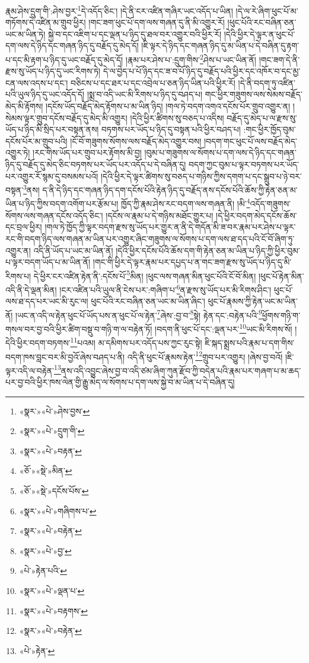རྣམ་ཤེས་དྲུག་གི་:ཤེས་བྱར་\footnote{«སྣར་»«པེ་»ཤེས་བྱས་}དེ་འདོད་ཅིང་། །དེ་ནི་ངར་འཛིན་གཞིར་ཡང་འདོད་པ་ཡིན། །དེ་ལ་རེ་ཞིག་ཕུང་པོ་མ་གཏོགས་དེ་འཛིན་མ་གྲུབ་ཕྱིར། །གང་ཟག་ཕུང་པོ་དག་ལས་གཞན་དུ་ནི་མི་འགྱུར་རོ། །ཕུང་པོའི་རང་བཞིན་ཅན་ཡང་མ་ཡིན་ཏེ། སྐྱེ་བ་དང་འཇིག་པ་དང་ལྡན་པ་ཉིད་དུ་ཐལ་བར་འགྱུར་བའི་ཕྱིར་རོ། །དེའི་ཕྱིར་དེ་ལྟར་ན་ཕུང་པོ་དག་ལས་དེ་ཉིད་དང་གཞན་ཉིད་དུ་བརྗོད་དུ་མེད་དོ། །ཇི་ལྟར་དེ་ཉིད་དང་གཞན་ཉིད་དུ་མ་ཡིན་པ་དེ་བཞིན་དུ་རྟག་པ་དང་མི་རྟག་པ་ཉིད་དུ་ཡང་བརྗོད་དུ་མེད་དོ། །རྣམ་པར་ཤེས་པ་:དྲུག་གིས་\footnote{«སྣར་»«པེ་»དྲུག་གི་}ཤེས་པ་ཡང་ཡིན་ནོ། །གང་ཟག་དེ་ནི་རྫས་སུ་ཡོད་པ་ཉིད་དུ་ཡང་རིགས་ཏེ། དེ་ལ་བྱེད་པ་པོ་ཉིད་དང་ཟ་བ་པོ་ཉིད་དུ་བརྗོད་པའི་ཕྱིར་དང་འཁོར་བ་དང་མྱ་ངན་ལས་འདས་པ་དང་། བཅིངས་པ་དང་ཐར་པ་དང་འབྲེལ་པ་ཅན་ཉིད་ཡིན་པའི་ཕྱིར་རོ། །དེ་ནི་བདག་ཏུ་འཛིན་པའི་ཡུལ་ཉིད་དུ་ཡང་འདོད་དོ། །སྨྲ་བ་འདི་ཡང་མི་རིགས་པ་ཉིད་དུ་བཤད་པ། གང་ཕྱིར་གཟུགས་ལས་སེམས་བརྗོད་མེད་མི་རྟོགས། །དངོས་ཡོད་བརྗོད་མེད་རྟོགས་པ་མ་ཡིན་ཉིད། །གལ་ཏེ་བདག་འགའ་དངོས་པོར་གྲུབ་འགྱུར་ན། །སེམས་ལྟར་གྲུབ་དངོས་བརྗོད་དུ་མེད་མི་འགྱུར། །དེའི་ཕྱིར་ཚིགས་སུ་བཅད་པ་འདིས། བརྗོད་དུ་མེད་པ་ལ་རྫས་སུ་ཡོད་པ་ཉིད་མི་སྲིད་པར་བསྟན་ནས། བཏགས་པར་ཡོད་པ་ཉིད་དུ་བསྟན་པའི་ཕྱིར་བཤད་པ། :གང་ཕྱིར་ཁྱོད་བུམ་དངོས་པོར་མ་གྲུབ་པའི། །ངོ་བོ་གཟུགས་སོགས་ལས་བརྗོད་མེད་འགྱུར་བས། །བདག་གང་ཕུང་པོ་ལས་བརྗོད་མེད་འགྱུར་ཏེ། །རང་གིས་ཡོད་པར་གྲུབ་པར་རྟོགས་མི་བྱ། །བུམ་པ་གཟུགས་ལ་སོགས་པ་དག་ལས་དེ་ཉིད་དང་གཞན་ཉིད་དུ་བརྗོད་དུ་མེད་ཅིང་བཏགས་པར་ཡོད་པར་འདོད་པ་དེ་བཞིན་དུ། བདག་ཀྱང་བུམ་པ་ལྟར་བཏགས་པར་ཡོད་པར་འགྱུར་རོ་སྙམ་དུ་བསམས་པའོ། །དེའི་ཕྱིར་དེ་ལྟར་ཚིགས་སུ་བཅད་པ་གཉིས་ཀྱིས་དགག་པ་དང་སྒྲུབ་པ་ཉེ་བར་བསྟན་\footnote{«སྣར་»«པེ་»བརྟན་}ནས། ད་ནི་དེ་ཉིད་དང་གཞན་ཉིད་དག་དངོས་པོའི་རྟེན་ཉིད་དུ་བརྗོད་ནས་དངོས་པོའི་ཆོས་ཀྱི་རྟེན་ཅན་མ་ཡིན་པ་ཉིད་ཀྱིས་བདག་འགོག་པར་རྩོམ་པ། ཁྱོད་ཀྱི་རྣམ་ཤེས་རང་བདག་ལས་གཞན་ནི། །མི་\footnote{«ཅོ་»«སྡེ་»མིན་}འདོད་གཟུགས་སོགས་ལས་གཞན་དངོས་འདོད་ཅིང་། །དངོས་ལ་རྣམ་པ་དེ་གཉིས་མཐོང་གྱུར་པ། །དེ་ཕྱིར་བདག་མེད་དངོས་ཆོས་དང་བྲལ་ཕྱིར། །གལ་ཏེ་ཁྱོད་ཀྱི་ལྟར་བདག་རྫས་སུ་ཡོད་པར་གྱུར་ན་ནི་དེ་གདོན་མི་ཟ་བར་རྣམ་པར་ཤེས་པ་ལྟར་རང་གི་བདག་ཉིད་ལས་གཞན་མ་ཡིན་པར་འགྱུར་ཞིང་གཟུགས་ལ་སོགས་པ་དག་ལས་ཐ་དད་པའི་ངོ་བོ་ཞིག་ཏུ་འགྱུར་ན། འདི་ནི་ཡོད་པ་ཡང་མ་ཡིན་ནོ། །དེའི་ཕྱིར་དངོས་པོའི་ཆོས་དག་གི་རྟེན་ཅན་མ་ཡིན་པ་ཉིད་ཀྱི་ཕྱིར་བུམ་པ་ལྟར་བདག་ཡོད་པ་མ་ཡིན་ནོ། །གང་གི་ཕྱིར་དེ་ལྟར་རྣམ་པར་དཔྱད་པ་ན་གང་ཟག་རྫས་སུ་ཡོད་པ་ཉིད་དུ་མི་རིགས་པ། དེ་ཕྱིར་ངར་འཛིན་རྟེན་ནི་:དངོས་པོ་\footnote{«ཅོ་»«སྡེ་»དངོས་པོས་}མིན། །ཕུང་ལས་གཞན་མིན་ཕུང་པོའི་ངོ་བོ་མིན། །ཕུང་པོ་རྟེན་མིན་འདི་ནི་དེ་ལྡན་མིན། །ངར་འཛིན་པའི་ཡུལ་ནི་ངེས་པར་:གཞིག་པ་\footnote{«སྣར་»«པེ་»གཞིགས་པ་}ན་རྫས་སུ་ཡོད་པར་མི་རིགས་ཤིང་། ཕུང་པོ་ལས་ཐ་དད་པར་ཡང་མི་རུང་ལ། ཕུང་པོའི་རང་བཞིན་ཅན་ཡང་མ་ཡིན་ཞིང་། ཕུང་པོ་རྣམས་ཀྱི་རྟེན་ཡང་མ་ཡིན་ནོ། །ཡང་ན་འདི་ལ་རྟེན་ཕུང་པོ་ཡོད་པས་ན་ཕུང་པོ་ལ་རྟེན་\footnote{«སྣར་»«པེ་»བརྟེན་}ཞེས་:བྱ་བ་\footnote{«སྣར་»«པེ་»བྱ་}སྟེ། རྟེན་དང་:བརྟེན་པའི་\footnote{«པེ་»རྟེན་པའི་}ཕྱོགས་གཉི་ག་གསལ་བར་བྱ་བའི་ཕྱིར་ཚིག་བསྡུ་བ་གཉི་ག་ལ་བརྟེན་ཏོ། །བདག་ནི་ཕུང་པོ་དང་:ལྡན་པར་\footnote{«སྣར་»«པེ་»ལྡན་པ་}ཡང་མི་རིགས་སོ། །དེའི་ཕྱིར་བདག་བཏགས་\footnote{«སྣར་»«པེ་»བརྟགས་}པའམ། མ་དམིགས་པར་འདོད་པས་ཀྱང་རུང་སྟེ། ཇི་སྐད་སྨྲས་པའི་རྣམ་པ་དག་གིས་བདག་ཁས་བླང་བར་མི་བྱའོ་ཞེས་བཤད་པ་ནི། འདི་ནི་ཕུང་པོ་རྣམས་རྟེན་\footnote{«སྣར་»«པེ་»བརྟེན་}གྲུབ་པར་འགྱུར། །ཞེས་བྱ་བའོ། །ཇི་ལྟར་འདི་ལ་བརྟེན་\footnote{«པེ་»རྟེན་}ནས་འདི་འབྱུང་ཞེས་བྱ་བ་འདི་ཙམ་ཞིག་ཀུན་རྫོབ་ཀྱི་བདེན་པའི་རྣམ་པར་གཞག་པ་མ་ཆད་པར་བྱ་བའི་ཕྱིར་ཁས་ལེན་གྱི་རྒྱུ་མེད་ལ་སོགས་པ་དག་ལས་སྐྱེ་བ་མ་ཡིན་པ་དེ་བཞིན་དུ། 